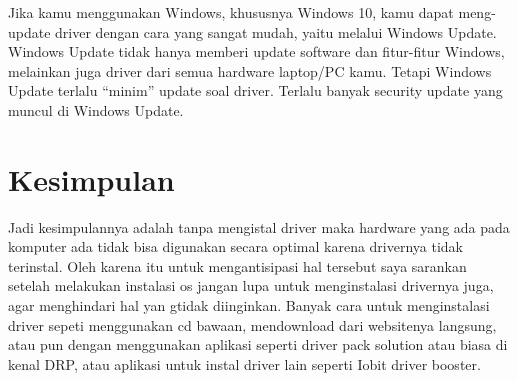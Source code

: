 Jika kamu menggunakan Windows, khususnya Windows 10, kamu dapat meng-update driver dengan cara yang sangat mudah, yaitu melalui Windows Update.
Windows Update tidak hanya memberi update software dan fitur-fitur Windows, melainkan juga driver dari semua hardware laptop/PC kamu. Tetapi Windows Update terlalu “minim” update soal driver. Terlalu banyak security update yang muncul di Windows Update.

\section{Kesimpulan}
Jadi kesimpulannya adalah tanpa mengistal driver maka hardware yang ada pada komputer ada tidak bisa digunakan secara optimal karena drivernya tidak terinstal. Oleh karena itu untuk mengantisipasi hal tersebut saya sarankan setelah melakukan instalasi os jangan lupa untuk menginstalasi drivernya juga, agar menghindari hal yan gtidak diinginkan. Banyak cara untuk menginstalasi driver sepeti menggunakan cd bawaan, mendownload dari websitenya langsung, atau pun dengan menggunakan aplikasi seperti driver pack solution atau biasa di kenal DRP, atau aplikasi untuk instal driver lain seperti Iobit driver booster.